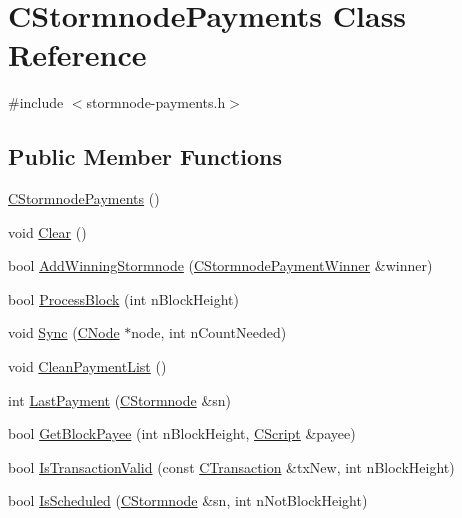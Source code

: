 \hypertarget{class_c_stormnode_payments}{}\section{C\+Stormnode\+Payments Class Reference}
\label{class_c_stormnode_payments}


{\ttfamily \#include $<$stormnode-\/payments.\+h$>$}

\subsection*{Public Member Functions}
\begin{DoxyCompactItemize}
\item 
\hyperlink{class_c_stormnode_payments_aab9f6e5ac034c9573690e627190d3c84}{C\+Stormnode\+Payments} ()
\item 
void \hyperlink{class_c_stormnode_payments_a829e8562a7530332d0096038b455e79d}{Clear} ()
\item 
bool \hyperlink{class_c_stormnode_payments_a8781a05c217f2b7b34bb2c57e0a6c813}{Add\+Winning\+Stormnode} (\hyperlink{class_c_stormnode_payment_winner}{C\+Stormnode\+Payment\+Winner} \&winner)
\item 
bool \hyperlink{class_c_stormnode_payments_a348b88dd03ef4a6684ae22141de841c8}{Process\+Block} (int n\+Block\+Height)
\item 
void \hyperlink{class_c_stormnode_payments_a813695c47afcbedba8858c36cb30bcfe}{Sync} (\hyperlink{class_c_node}{C\+Node} $\ast$node, int n\+Count\+Needed)
\item 
void \hyperlink{class_c_stormnode_payments_a0113fb8a5dc2e0b0efd0b8180535f9d0}{Clean\+Payment\+List} ()
\item 
int \hyperlink{class_c_stormnode_payments_a16c152a68d00c1643c99c911f87503c8}{Last\+Payment} (\hyperlink{class_c_stormnode}{C\+Stormnode} \&sn)
\item 
bool \hyperlink{class_c_stormnode_payments_a29c31e98d23f4a7f150bbccd4ef5a5cb}{Get\+Block\+Payee} (int n\+Block\+Height, \hyperlink{class_c_script}{C\+Script} \&payee)
\item 
bool \hyperlink{class_c_stormnode_payments_ae14691c97882f093b8c852f03d7f5884}{Is\+Transaction\+Valid} (const \hyperlink{class_c_transaction}{C\+Transaction} \&tx\+New, int n\+Block\+Height)
\item 
bool \hyperlink{class_c_stormnode_payments_ac2a8e2a9bef3c4c68c1e464903a1988f}{Is\+Scheduled} (\hyperlink{class_c_stormnode}{C\+Stormnode} \&sn, int n\+Not\+Block\+Height)

\end{DoxyCompactItemize}
